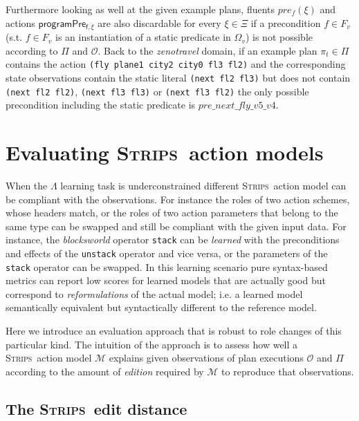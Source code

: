 \documentclass[3p,times]{elsarticle}
\newcommand{\strips}{\textsc{Strips}}     %
\begin{document}
Furthermore looking as well at the given example plans, fluents $pre_f(\xi)$ and actions $\mathsf{programPre_{f,\xi}}$ are also discardable for every $\xi\in\Xi$ if a precondition $f\in F_v$ (s.t. $f\in F_v$ is an instantiation of a static predicate in $\Omega_v$) is not possible according to $\Pi$ and $\mathcal{O}$. Back to the {\em zenotravel} domain, if an example plan $\pi_t\in \Pi$ contains the action {\tt\small (fly plane1 city2 city0 fl3 fl2)} and the corresponding state observations contain the static literal {\tt\small (next fl2 fl3)} but does not contain {\tt\small (next fl2 fl2)}, {\tt\small (next fl3 fl3)} or {\tt\small (next fl3 fl2)} the only possible precondition including the static predicate is $pre\_next\_fly\_v5\_v4$.



\section{Evaluating \strips\ action models}
\label{sec:Section6}
When the $\Lambda$ learning task is underconstrained different \strips\ action model can be compliant with the observations. For instance the roles of two action schemes, whose headers match, or the roles of two action parameters that belong to the same type can be swapped and still be compliant with the given input data. For instance, the {\em blocksworld} operator {\small\tt stack} can be {\em learned} with the preconditions and effects of the {\small\tt unstack} operator and vice versa, or the parameters of the {\small\tt stack} operator can be swapped. In this learning scenario pure syntax-based metrics can report low scores for learned models that are actually good but correspond to {\em reformulations} of the actual model; i.e. a learned model semantically equivalent but syntactically different to the reference model.

Here we introduce an evaluation approach that is robust to role changes of this particular kind. The intuition of the approach is to assess how well a \strips\ action model $\mathcal{M}$ explains given observations of plan executions $\mathcal{O}$ and $\Pi$ according to the amount of {\em edition} required by $\mathcal{M}$ to reproduce that observations. %

\subsection{The \strips\ edit distance}
\end{document}
